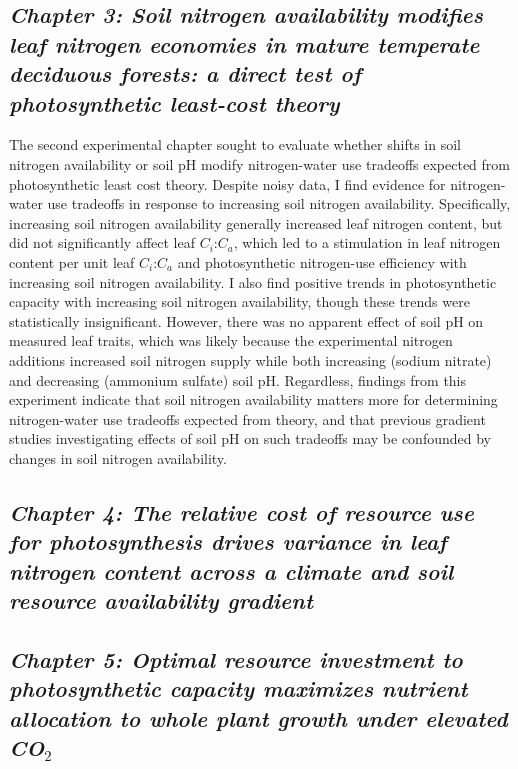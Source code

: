 \begin{singlespace}
    \subsection{\textit{Chapter 3: Soil nitrogen availability modifies leaf nitrogen economies in mature temperate deciduous forests: a direct test of photosynthetic least-cost theory}}   
\end{singlespace}

\noindent The second experimental chapter sought to evaluate whether shifts in soil nitrogen availability or soil pH modify nitrogen-water use tradeoffs expected from photosynthetic least cost theory. Despite noisy data, I find evidence for nitrogen-water use tradeoffs in response to increasing soil nitrogen availability. Specifically, increasing soil nitrogen availability generally increased leaf nitrogen content, but did not significantly affect leaf $C_{i}$:$C_{a}$, which led to a stimulation in leaf nitrogen content per unit leaf $C_{i}$:$C_{a}$ and photosynthetic nitrogen-use efficiency with increasing soil nitrogen availability. I also find positive trends in photosynthetic capacity with increasing soil nitrogen availability, though these trends were statistically insignificant. However, there was no apparent effect of soil pH on measured leaf traits, which was likely because the experimental nitrogen additions increased soil nitrogen supply while both increasing (sodium nitrate) and decreasing (ammonium sulfate) soil pH. Regardless, findings from this experiment indicate that soil nitrogen availability matters more for determining nitrogen-water use tradeoffs expected from theory, and that previous gradient studies investigating effects of soil pH on such tradeoffs may be confounded by changes in soil nitrogen availability.

\begin{singlespace}
    \subsection{\textit{Chapter 4: The relative cost of resource use for photosynthesis drives variance in leaf nitrogen content across a climate and soil resource availability gradient}}   
\end{singlespace}


\begin{singlespace}
    \subsection{\textit{Chapter 5: Optimal resource investment to photosynthetic capacity maximizes nutrient allocation to whole plant growth under elevated CO$_2$}}
\end{singlespace}